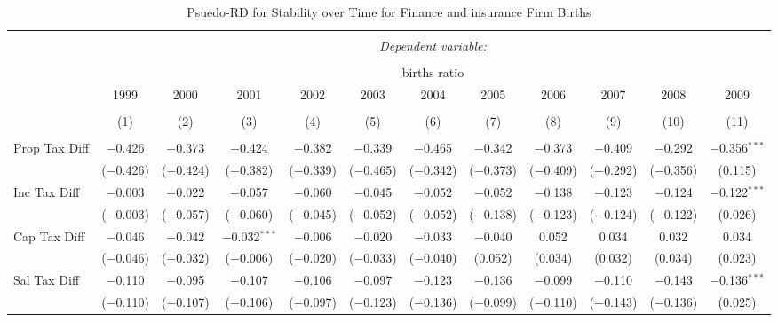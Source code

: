 
\begin{table}[!htbp] \centering 
  \caption{Psuedo-RD for Stability over Time for  Finance and insurance Firm Births} 
  \label{52year} 
\small 
\begin{tabular}{@{\extracolsep{5pt}}lccccccccccc} 
\\[-1.8ex]\hline 
\hline \\[-1.8ex] 
 & \multicolumn{11}{c}{\textit{Dependent variable:}} \\ 
\cline{2-12} 
\\[-1.8ex] & \multicolumn{11}{c}{births ratio} \\ 
 & 1999 & 2000 & 2001 & 2002 & 2003 & 2004 & 2005 & 2006 & 2007 & 2008 & 2009 \\ 
\\[-1.8ex] & (1) & (2) & (3) & (4) & (5) & (6) & (7) & (8) & (9) & (10) & (11)\\ 
\hline \\[-1.8ex] 
 Prop Tax Diff & $-$0.426 & $-$0.373 & $-$0.424 & $-$0.382 & $-$0.339 & $-$0.465 & $-$0.342 & $-$0.373 & $-$0.409 & $-$0.292 & $-$0.356$^{***}$ \\ 
  & ($-$0.426) & ($-$0.424) & ($-$0.382) & ($-$0.339) & ($-$0.465) & ($-$0.342) & ($-$0.373) & ($-$0.409) & ($-$0.292) & ($-$0.356) & (0.115) \\ 
  Inc Tax Diff & $-$0.003 & $-$0.022 & $-$0.057 & $-$0.060 & $-$0.045 & $-$0.052 & $-$0.052 & $-$0.138 & $-$0.123 & $-$0.124 & $-$0.122$^{***}$ \\ 
  & ($-$0.003) & ($-$0.057) & ($-$0.060) & ($-$0.045) & ($-$0.052) & ($-$0.052) & ($-$0.138) & ($-$0.123) & ($-$0.124) & ($-$0.122) & (0.026) \\ 
  Cap Tax Diff & $-$0.046 & $-$0.042 & $-$0.032$^{***}$ & $-$0.006 & $-$0.020 & $-$0.033 & $-$0.040 & 0.052 & 0.034 & 0.032 & 0.034 \\ 
  & ($-$0.046) & ($-$0.032) & ($-$0.006) & ($-$0.020) & ($-$0.033) & ($-$0.040) & (0.052) & (0.034) & (0.032) & (0.034) & (0.023) \\ 
  Sal Tax Diff & $-$0.110 & $-$0.095 & $-$0.107 & $-$0.106 & $-$0.097 & $-$0.123 & $-$0.136 & $-$0.099 & $-$0.110 & $-$0.143 & $-$0.136$^{***}$ \\ 
  & ($-$0.110) & ($-$0.107) & ($-$0.106) & ($-$0.097) & ($-$0.123) & ($-$0.136) & ($-$0.099) & ($-$0.110) & ($-$0.143) & ($-$0.136) & (0.025) \\ 

\end{tabular}
\end{table}
